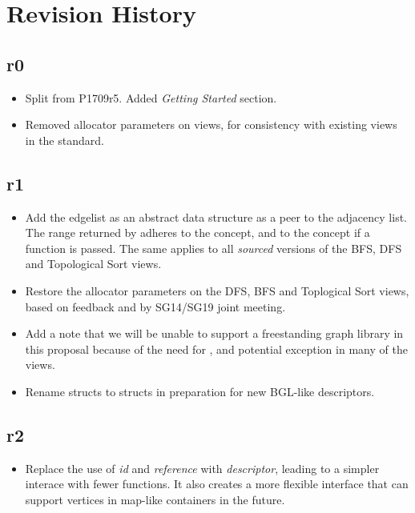\section{Revision History}

\subsection*{\paperno r0}

\begin{itemize}
      \item Split from P1709r5. Added \textit{Getting Started} section.
      \item Removed allocator parameters on views, for consistency with existing views in the standard. 
\end{itemize}

\subsection*{\paperno r1}
\begin{itemize}
      \item Add the edgelist as an abstract data structure as a peer to the adjacency list. 
            The range returned by  adheres to the  concept,
            and to the  concept if a  function is passed. The same applies to
            all \textit{sourced} versions of the BFS, DFS and Topological Sort views.
      \item Restore the allocator parameters on the DFS, BFS and Toplogical Sort views, based on feedback and 
            by SG14/SG19 joint meeting.
      \item Add a note that we will be unable to support a freestanding graph library in this proposal because
            of the need for ,  and potential  exception in many of 
            the views.
      \item Rename  structs to  structs in preparation for new BGL-like descriptors.
\end{itemize}

\subsection*{\paperno r2}
\begin{itemize}
      \item Replace the use of \textit{id} and \textit{reference} with \textit{descriptor}, leading to a simpler
            interace with fewer functions. It also creates a more flexible interface that can support vertices in
            map-like containers in the future.
\end{itemize}
